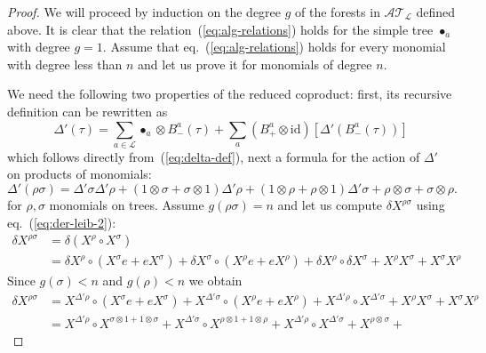 \documentclass[a4paper,11pt,reqno]{article}
\newcommand{\1}{{\bf 1}}
\newcommand{\der}{\delta}
\newcommand{\LL}{\mathcal{L}}
\newcommand{\cl}{\mathcal L}
\newcommand{\TT}{\mathcal{T}}
\newcommand{\cA}{\mathcal{A}}
\newcommand{\troot}{\bullet}
\begin{document}
\begin{proof}
We will proceed by induction on the degree $g$  of the forests in $\cA
\TT_\cl$ defined above. It is clear that the
relation~(\ref{eq:alg-relations}) holds for the simple tree $\troot_a$
with degree $g=1$. Assume that eq.~(\ref{eq:alg-relations}) holds for
every monomial with degree less than $n$ and let us prove it for
monomials of degree $n$.

We need the following two properties of the reduced coproduct: first, its
recursive definition can be rewritten as
\begin{equation}
  \label{eq:delta-prime-rec}
 \Delta'(\tau) = \sum_{a\in\LL} \troot_a \otimes B^a_-(\tau)  + \sum_a (B_+^a
 \otimes \text{id}) [\Delta'(B_-^a(\tau))]    
\end{equation}
which follows directly from~(\ref{eq:delta-def}), next a formula for
the action of $\Delta'$ on products of monomials:
\begin{equation}
\label{eq:leib-delta-prime}
\Delta'(\rho \sigma) = \Delta' \sigma \Delta' \rho 
+ (1\otimes \sigma + \sigma \otimes 1) \Delta' \rho 
+ (1\otimes \rho + \rho \otimes 1) \Delta' \sigma 
+ \rho \otimes \sigma + \sigma \otimes \rho.  
\end{equation}
for  $\rho,\sigma$ monomials on trees. Assume $g(\rho\sigma) = n$ and let us compute $\der X^{\rho
  \sigma}$ using eq.~(\ref{eq:der-leib-2}):
\begin{equation*}
  \begin{split}
\der X^{\rho \sigma} & = \der (X^\rho \circ X^\sigma) 
\\ & =   
\der X^\rho \circ (X^\sigma e + e X^\sigma) + \der X^\sigma \circ (X^\rho e + e
X^\rho) + \der X^\rho \circ \der X^\sigma + X^\rho X^\sigma + X^\sigma X^\rho    
  \end{split}
\end{equation*}
Since $g(\sigma) < n$ and $g(\rho) < n$ we obtain
\begin{equation*}
  \begin{split}
\der X^{\rho \sigma}
& =   
X^{\Delta' \rho} \circ (X^\sigma e + e X^\sigma) +  X^{\Delta'\sigma} \circ (X^\rho e + e
X^\rho) +  X^{\Delta'\rho} \circ  X^{\Delta'\sigma} + X^\rho X^\sigma + X^\sigma X^\rho    
\\& =   
X^{\Delta' \rho} \circ X^{\sigma\otimes 1 + 1 \otimes \sigma} +
X^{\Delta'\sigma} \circ X^{\rho\otimes 1 + 1 \otimes \rho} +
X^{\Delta'\rho} \circ  X^{\Delta'\sigma} + X^{\rho \otimes \sigma} +

\end{split}
\end{equation*}
\end{proof}
\end{document}
